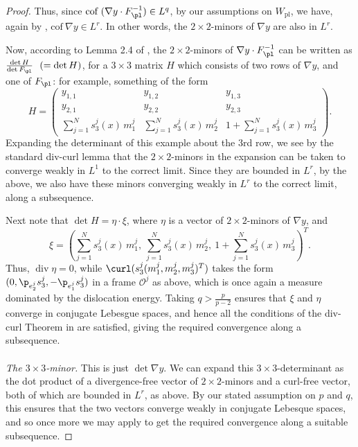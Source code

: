 \documentclass[11pt,reqno]{amsart}
\renewcommand{\div}{\operatorname{div}}
\theoremstyle{plain}
\theoremstyle{definition}
\theoremstyle{remark}
\begin{document}
\begin{proof}
Thus, since $\textrm{cof}~(\nabla y\cdot F^{-1}_\pl)\in L^q$, by our assumptions on $W_{\mathrm{pl}}$, we have, again by \cite{MM}, $\textrm{cof}~\nabla y\in L^r$. In other words, the $2\times 2$-minors of $\nabla y$ are also in $L^r$.

Now, according to Lemma 2.4 of \cite{MM}, the $2\times 2$-minors of $\nabla y\cdot F^{-1}_\pl$ can be written as $\frac{\det H}{\det F_\pl} ~~(=\det H)$, for a $3\times 3$ matrix $H$ which consists of two rows of $\nabla y$, and one of $F_\pl$: for example, something of the form
\[
H=
\begin{pmatrix}
y_{1,1} & y_{1,2} & y_{1,3}\\
y_{2,1} & y_{2,2} & y_{2,3}\\
\sum_{j=1}^N s^j_3(x)\, m^j_1   & \sum_{j=1}^N s^j_3(x)\, m^j_2  & 1 +\sum_{j=1}^N s^j_3(x)\, m^j_3
\end{pmatrix}.
\]
Expanding the determinant of this example about the 3rd row, we see by the standard div-curl lemma that the $2\times2$-minors in the expansion can be taken to converge weakly in $L^1$ to the correct limit. Since they are bounded in $L^r$, by the above, we also have these minors converging weakly in $L^r$ to the correct limit, along a subsequence.

Next note that $\det H = \eta\cdot\xi$, where $\eta$ is a vector of $2\times2$-minors of $\nabla y$, and 
\[\xi = \left(\sum_{j=1}^N s^j_3(x)\, m^j_1,~\sum_{j=1}^N s^j_3(x)\, m^j_2,~ 1 +\sum_{j=1}^N s^j_3(x)\, m^j_3\right)^T. 
\]
Thus, $\div\eta = 0$, while $\curl(s_3^j(m_1^j,m_2^j,m_3^j)^T)$ takes the form $(0,\p_{e_2^j}s_3^j ,- \p_{e_1^j}s_3^j)$ in a frame $\mathcal{O}^j$ as above, which is once again a measure dominated by the dislocation energy. Taking $q>\frac{p}{p-2}$ ensures that $\xi$ and $\eta$ converge in conjugate Lebesgue spaces, and hence all the conditions of the div-curl Theorem in \cite{cdm} are satisfied, giving the required convergence along a subsequence.
\\~\\
{\em The $3\times 3$-minor.} This is just $\det\nabla y$. We can expand this $3\times3$-determinant as the dot product of a divergence-free vector of $2\times2$-minors and a curl-free vector, both of which are bounded in $L^r$, as above. By our stated assumption on $p$ and $q$, this ensures that the two vectors converge weakly in conjugate Lebesque spaces, and so once more we may apply \cite{cdm} to get the required convergence along a suitable subsequence.
\end{proof}
\end{document}
